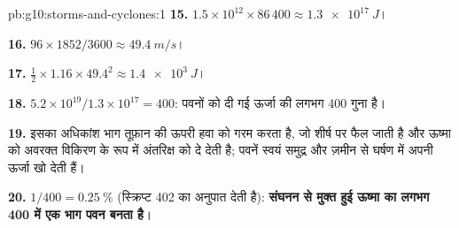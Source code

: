 \begin{solution}{pb:g10:storms-and-cyclones:1}
\textbf{15.} $1.5\times10^{12} \times 86\,400 \approx \qty{1.3e17}{J}$।

\textbf{16.} $96 \times 1852/3600 \approx \qty{49.4}{m/s}$।

\textbf{17.} $\frac12 \times 1.16 \times 49.4^2 \approx \qty{1.4e3}{J}$।

\textbf{18.} $5.2\times10^{19}/1.3\times10^{17} = 400$: 
पवनों को दी गई ऊर्जा की लगभग 400 गुना है।

\textbf{19.} इसका अधिकांश भाग तूफ़ान की ऊपरी हवा को गरम करता है, जो शीर्ष पर फैल
जाती है और ऊष्मा को अवरक्त विकिरण के रूप में अंतरिक्ष को दे देती है; पवनें स्वयं
समुद्र और ज़मीन से घर्षण में अपनी ऊर्जा खो देती हैं।

\textbf{20.} $1/400 = \qty{0.25}{\percent}$ (स्क्रिप्ट
402 का अनुपात देती है): \textbf{संघनन से मुक्त हुई ऊष्मा का लगभग 400 में एक भाग
पवन बनता है}।
\end{solution}
